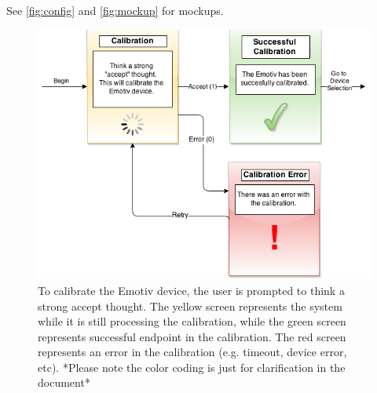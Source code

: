 \documentclass{article}
\begin{document}
See \autoref{fig:config} and \autoref{fig:mockup} for mockups.
\begin{figure}
	\includegraphics[width=\textwidth]{ConfigurationUI_srs_final.png}
	
	\caption{To calibrate the Emotiv device, the user is prompted to think a strong accept thought. The yellow screen represents the system while it is still processing the calibration, while the green screen represents successful endpoint in the calibration. The red screen represents an error in the calibration (e.g. timeout, device error, etc). *Please note the color coding is just for clarification in the document*}
	\label{fig:config}
\end{figure}
\end{document}
